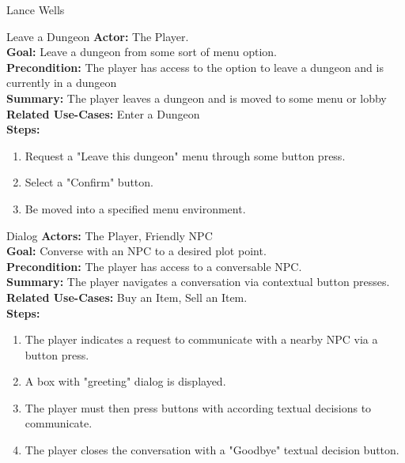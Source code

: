 \documentclass[12pt]{report}
\begin{document}
\begin{section}{Lance Wells}
\begin{subsection}{Leave a Dungeon}
\textbf{Actor:} The Player. \\
\textbf{Goal:} Leave a dungeon from some sort of menu option. \\
\textbf{Precondition:} The player has access to the option to leave a dungeon and is currently in a dungeon \\
\textbf{Summary:} The player leaves a dungeon and is moved to some menu or lobby \\
\textbf{Related Use-Cases:} Enter a Dungeon \\
\textbf{Steps:}
\begin{enumerate}
	\item Request a "Leave this dungeon" menu through some button press.
	\item Select a "Confirm" button.
	\item Be moved into a specified menu environment.
\end{enumerate}
\end{subsection}

\begin{subsection}{Dialog}
\textbf{Actors:} The Player, Friendly NPC \\
\textbf{Goal:} Converse with an NPC to a desired plot point. \\
\textbf{Precondition:} The player has access to a conversable NPC. \\
\textbf{Summary:} The player navigates a conversation via contextual button presses. \\
\textbf{Related Use-Cases:} Buy an Item, Sell an Item. \\
\textbf{Steps:}
\begin{enumerate}
	\item The player indicates a request to communicate with a nearby NPC via a button press.
	\item A box with "greeting" dialog is displayed.
	\item The player must then press buttons with according textual decisions to communicate.
	\item The player closes the conversation with a "Goodbye" textual decision button.
\end{enumerate}
\end{subsection}

\end{section}
\end{document}
